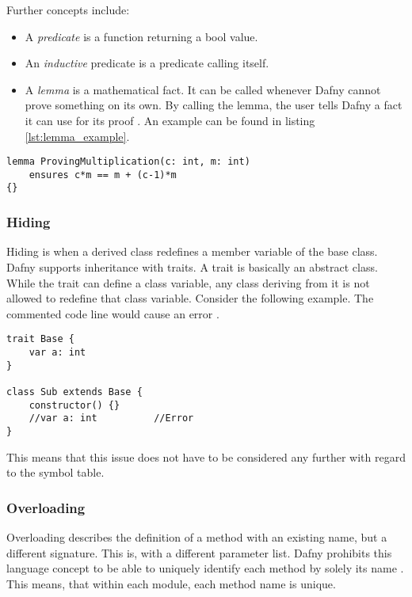 Further concepts include:
\begin{itemize}
\item A \textit{predicate} is a function returning a bool value.
\item An \textit{inductive} predicate is a predicate calling itself.
\item A \textit{lemma} is a mathematical fact.
It can be called whenever Dafny cannot prove something on its own.
By calling the lemma, the user tells Dafny a fact it can use for its proof \cite{dafnyReferenceManual}.
An example can be found in listing \ref{lst:lemma_example}.
\end{itemize}

\begin{lstlisting}[language=dafny, caption={Lemma}, captionpos=b, label={lst:lemma_example}]
lemma ProvingMultiplication(c: int, m: int)
    ensures c*m == m + (c-1)*m
{}
\end{lstlisting}

\subsubsection{Hiding}
Hiding is when a derived class redefines a member variable of the base class.
Dafny supports inheritance with traits.
A trait is basically an abstract class.
While the trait can define a class variable, any class deriving from it is not allowed to redefine that class variable.
Consider the following example.
The commented code line would cause an error \cite{dafnyReferenceManual}.

\begin{lstlisting}[language=dafny, caption={Hiding}, captionpos=b, label={lst:hiding}]
trait Base {
    var a: int
}

class Sub extends Base {
    constructor() {}
    //var a: int          //Error
}
\end{lstlisting}

This means that this issue does not have to be considered any further with regard to the symbol table.

\subsubsection{Overloading}
Overloading describes the definition of a method with an existing name, but a different signature.
This is, with a different parameter list.
Dafny prohibits this language concept to be able to uniquely identify each method by solely its name \cite{dafnyReferenceManual}.
This means, that within each module, each method name is unique.

